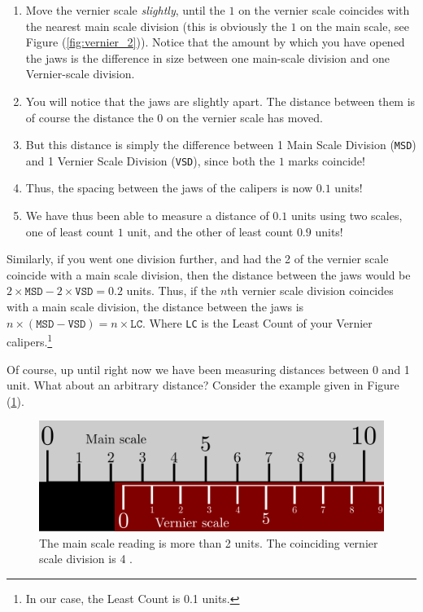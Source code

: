 \begin{enumerate}
    \item Move the vernier scale \textit{slightly}, until the $1$ on the vernier scale coincides with the nearest main scale division (this is obviously the $1$ on the main scale, see Figure (\ref{fig:vernier_2})). Notice that the amount by which you have opened the jaws is the difference in size between one main-scale division and one Vernier-scale division.
    
    \item You will notice that the jaws are slightly apart. The distance between them is of course the distance the $0$ on the vernier scale has moved.
    
    \item But this distance is simply the difference between 1 Main Scale Division (\texttt{MSD}) and 1 Vernier Scale Division (\texttt{VSD}), since both the $1$ marks coincide!
    
    \item Thus, the spacing between the jaws of the calipers is now $0.1$ units!
    
    \item We have thus been able to measure a distance of $0.1$ units using two scales, one of least count $1$ unit, and the other of least count $0.9$ units! 
    
\end{enumerate}

Similarly, if you went one division further, and had the 2 of the vernier scale coincide with a main scale division, then the distance between the jaws would be $2\times\texttt{MSD}-2\times\texttt{VSD}=0.2$ units. Thus, if the $n$th vernier scale division coincides with a main scale division, the distance between the jaws is $n \times (\texttt{MSD}-\texttt{VSD})=n \times \texttt{LC}$. Where \texttt{LC} is the Least Count of your Vernier calipers.\footnote{In our case, the Least Count is 0.1 units.}

Of course, up until right now we have been measuring distances between 0 and 1 unit.  What about an arbitrary distance? Consider the example given in Figure (\ref{fig:vernier_4}). 

\begin{figure}[!htb]
    \centering
    \includegraphics[scale=0.75]{figs/vernier4.png}
    \caption{The main scale reading is more than 2 units. The coinciding vernier scale division is 4 . }
    \label{fig:vernier_4}
\end{figure}

